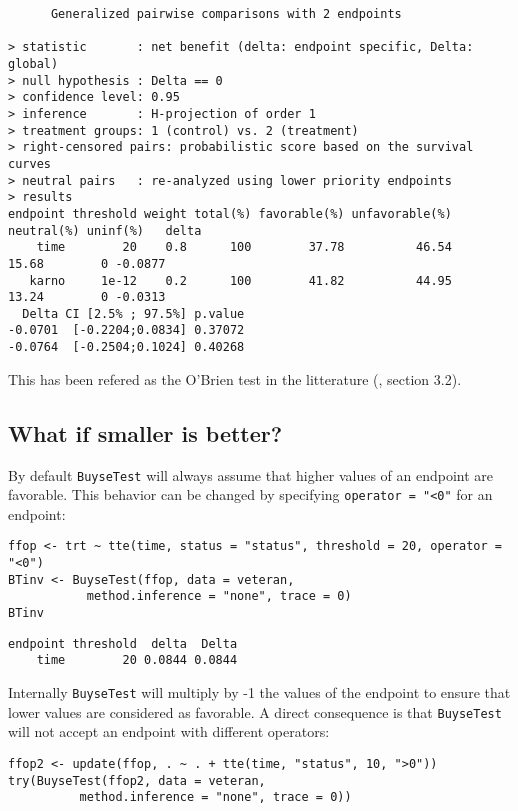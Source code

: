 \documentclass[12pt]{article}
\begin{document}
\begin{verbatim}
      Generalized pairwise comparisons with 2 endpoints

> statistic       : net benefit (delta: endpoint specific, Delta: global) 
> null hypothesis : Delta == 0 
> confidence level: 0.95 
> inference       : H-projection of order 1
> treatment groups: 1 (control) vs. 2 (treatment) 
> right-censored pairs: probabilistic score based on the survival curves
> neutral pairs   : re-analyzed using lower priority endpoints
> results
endpoint threshold weight total(%) favorable(%) unfavorable(%) neutral(%) uninf(%)   delta
    time        20    0.8      100        37.78          46.54      15.68        0 -0.0877
   karno     1e-12    0.2      100        41.82          44.95      13.24        0 -0.0313
  Delta CI [2.5% ; 97.5%] p.value 
-0.0701  [-0.2204;0.0834] 0.37072 
-0.0764  [-0.2504;0.1024] 0.40268
\end{verbatim}
This has been refered as the O’Brien test in the litterature
(\cite{verbeeck2019generalized}, section 3.2).

\clearpage

\subsection{What if smaller is better?}
\label{sec:orgf2c2fe8}
By default \texttt{BuyseTest} will always assume that higher values of an
endpoint are favorable. This behavior can be changed by specifying \texttt{operator = "<0"}
for an endpoint:
\lstset{language=r,label= ,caption= ,captionpos=b,numbers=none}
\begin{lstlisting}
ffop <- trt ~ tte(time, status = "status", threshold = 20, operator = "<0")
BTinv <- BuyseTest(ffop, data = veteran, 
		   method.inference = "none", trace = 0)
BTinv
\end{lstlisting}

\begin{verbatim}
endpoint threshold  delta  Delta
    time        20 0.0844 0.0844
\end{verbatim}

Internally \texttt{BuyseTest} will multiply by -1 the values of the endpoint
to ensure that lower values are considered as favorable. A direct
consequence is that \texttt{BuyseTest} will not accept an endpoint with
different operators:
\lstset{language=r,label= ,caption= ,captionpos=b,numbers=none}
\begin{lstlisting}
ffop2 <- update(ffop, . ~ . + tte(time, "status", 10, ">0"))
try(BuyseTest(ffop2, data = veteran, 
	      method.inference = "none", trace = 0))
\end{lstlisting}
\end{document}
